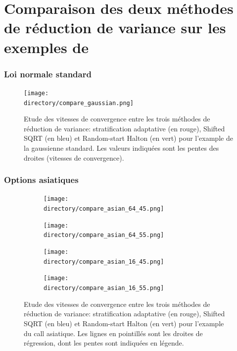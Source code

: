 \documentclass[12pt,a4paper]{report}
\def \directory {/home/jonathan/Programmation/C++/Projet_C++_S2/Images}
\begin{document}
\chapter[Comparaison sur les exemples de \cite{EJ08}]{Comparaison des deux méthodes de réduction de variance sur les exemples de \cite{EJ08}}

\subsection{Loi normale standard}

\begin{figure}[H]
\centering
	\texttt{[image: \\directory/compare\_gaussian.png]}

\caption{\small Etude des vitesses de convergence entre les trois méthodes de réduction de variance: stratification adaptative (en rouge), Shifted SQRT (en bleu) et Random-start Halton (en vert) pour l'example de la gaussienne standard. Les valeurs indiquées sont les pentes des droites (vitesses de convergence).}
\label{fig:compare_gaussian}
\end{figure}


\subsection{Options asiatiques}

\begin{figure}[H]
\centering
	\begin{subfigure}[scale=1]{0.45\textwidth}
			\texttt{[image: \\directory/compare\_asian\_64\_45.png]}
	\end{subfigure}
	\hfill
	\begin{subfigure}[scale=1]{0.45\textwidth}
			\texttt{[image: \\directory/compare\_asian\_64\_55.png]}
	\end{subfigure}
	\vspace{30pt}
	\begin{subfigure}[scale=1]{0.45\textwidth}
			\texttt{[image: \\directory/compare\_asian\_16\_45.png]}
	\end{subfigure}
	\hfill
	\begin{subfigure}[scale=1]{0.45\textwidth}
			\texttt{[image: \\directory/compare\_asian\_16\_55.png]}
	\end{subfigure}
	
\caption{\small Etude des vitesses de convergence entre les trois méthodes de réduction de variance: stratification adaptative (en rouge), Shifted SQRT (en bleu) et Random-start Halton (en vert) pour l'example du call asiatique. Les lignes en pointillés sont les droites de régression, dont les pentes sont indiquées en légende.}
\label{fig:compare_asian_call}
\end{figure}
\end{document}

